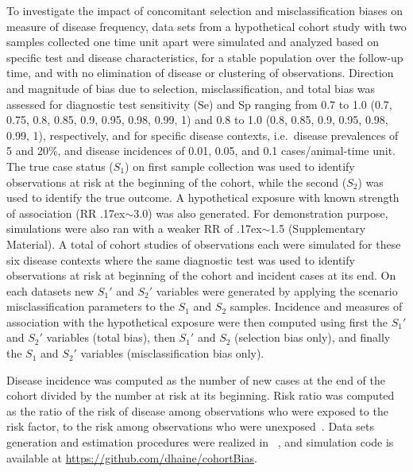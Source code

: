 To investigate the impact of concomitant selection and misclassification biases
on measure of disease frequency, data sets from a hypothetical cohort study with
two samples collected one time unit apart were simulated and analyzed based on
specific test and disease characteristics, for a stable population over the
follow-up time, and with no elimination of disease or clustering of
observations.
Direction and magnitude of bias due to selection, misclassification, and total
bias was assessed for diagnostic test sensitivity (Se) and Sp 
ranging from 0.7 to 1.0 (0.7, 0.75, 0.8, 0.85, 0.9, 0.95, 0.98, 0.99, 1) and 0.8
to 1.0 (0.8, 0.85, 0.9, 0.95, 0.98, 0.99, 1), respectively, and for specific
disease contexts, i.e.\ disease prevalences of 5 and 20\%, and disease
incidences of 0.01, 0.05, and 0.1 cases/animal-time unit.
The true case status (\(S_1\)) on first sample collection was used to identify
observations at risk at the beginning of the cohort, while the second (\(S_2\))
was used to identify the true outcome.
A hypothetical exposure with known strength of association (RR
\raise.17ex\hbox{$\scriptstyle\sim$}\num{3.0}) was also generated.
For demonstration purpose, simulations were also ran with a weaker RR of
\raise.17ex\hbox{$\scriptstyle\sim$}\num{1.5} (Supplementary Material).
A total of  cohort studies of  observations each
were simulated for these six disease contexts where the same diagnostic test was
used to identify observations at risk at beginning of the cohort and incident
cases at its end.
On each datasets new \(S_{1}'\) and \(S_{2}'\) variables were generated by
applying the scenario misclassification parameters to the \(S_1\) and \(S_2\)
samples.
Incidence and measures of association with the hypothetical exposure were then
computed using first the \(S_{1}'\) and \(S_{2}'\) variables (total bias), then
\(S_{1}'\) and \(S_2\) (selection bias only), and finally the \(S_1\) and
\(S_{2}'\) variables (misclassification bias only).

Disease incidence was computed as the number of new cases at the end of the
cohort divided by the number at risk at its beginning.
Risk ratio was computed as the  ratio of the risk of disease among observations
who were exposed to the risk factor, to the risk among observations who were
unexposed~\citep{Rothman2012}.
Data sets generation and estimation procedures were realized in
\R~\citep{Rsystem}, and simulation code is available at
\url{https://github.com/dhaine/cohortBias}.

